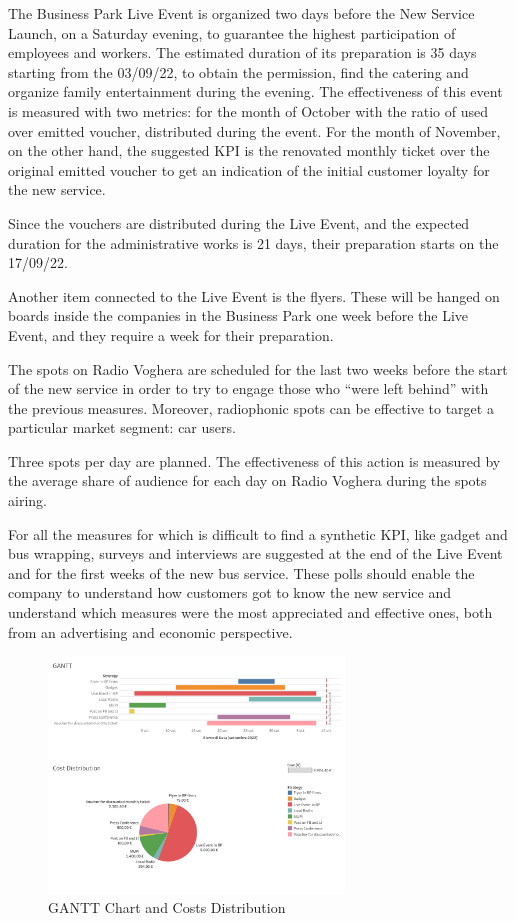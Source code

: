 The Business Park Live Event is organized two days before the New Service Launch, on a Saturday evening, to guarantee the highest participation of employees and workers. The estimated duration of its preparation is 35 days starting from the 03/09/22, to obtain the permission, find the catering and organize family entertainment during the evening. The effectiveness of this event is measured with two metrics: for the month of October with the ratio of used over emitted voucher, distributed during the event. For the month of November, on the other hand, the suggested KPI is the renovated monthly ticket over the original emitted voucher to get an indication of the initial customer loyalty for the new service.

Since the vouchers are distributed during the Live Event, and the expected duration for the administrative works is 21 days, their preparation starts on the 17/09/22.

Another item connected to the Live Event is the flyers. These will be hanged on boards inside the companies in the Business Park one week before the Live Event, and they require a week for their preparation.

The spots on Radio Voghera are scheduled for the last two weeks before the start of the new service in order to try to engage those who “were left behind” with the previous measures. Moreover, radiophonic spots can be effective to target a particular market segment: car users. 

Three spots per day are planned. The effectiveness of this action is measured by the average share of audience for each day on Radio Voghera during the spots airing.

For all the measures for which is difficult to find a synthetic KPI, like gadget and bus wrapping, surveys and interviews are suggested at the end of the Live Event and for the first weeks of the new bus service. These polls should enable the company to understand how customers got to know the new service and understand which measures were the most appreciated and effective ones, both from an advertising and economic perspective.


\begin{figure}[h]
    \centering
    \includegraphics[width=0.7\textwidth]{Images/merketing/graph_marketing.png}
    \caption{GANTT Chart and Costs Distribution}
    \label{fig:gantt}
\end{figure}